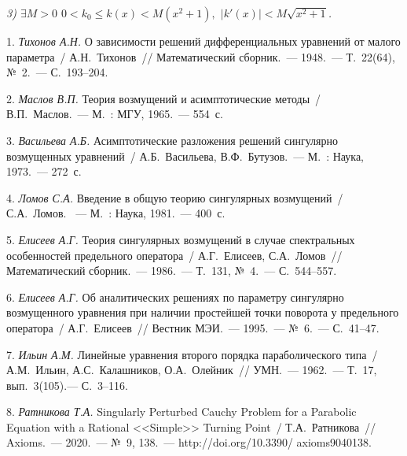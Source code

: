{\it 3) $\exists M>0$ $0<k_0\leq k(x)<M(x^2+1),$ $|k'(x)|<M \sqrt{x^2+1}$.}

\noindent {\it Тогда $\exists \mathbb{C}>0$ $\forall(x,t)\in(-\infty,+\infty)\times[0,T]$ $\forall\varepsilon\in(0,\varepsilon_0]$ $|R_n(x,t,\varepsilon)|\le \mathbb{C}.$ }

\litlist


1. {\it Тихонов А.Н.} О зависимости решений дифференциальных уравнений от малого параметра~/ А.Н.~Тихонов~// Математический сборник.~--- 1948.~--- Т.~22(64), №~2.~--- С.~193--204.

2. {\it Маслов В.П.} Теория возмущений и асимптотические методы~/ В.П.~Маслов.~--- М.~: МГУ, 1965.~--- 554~с.

3. {\it Васильева А.Б.} Асимптотические разложения решений сингулярно возмущенных уравнений~/ А.Б.~Васильева, В.Ф.~Бутузов.~--- М.~: Наука, 1973.~--- 272~с.

4. {\it Ломов С.А.} Введение в общую теорию сингулярных возмущений~/ С.А.~Ломов. ~--- М.~: Наука, 1981.~--- 400~с.

5. {\it Елисеев А.Г.} Теория сингулярных возмущений в случае спектральных особенностей предельного оператора~/ А.Г.~Елисеев, \linebreak С.А.~Ломов~// Математический сборник.~--- 1986.~--- Т.~131, №~4.~--- С.~544--557.

6. {\it Елисеев А.Г.} Об аналитических решениях по параметру сингулярно возмущенного уравнения при наличии простейшей точки поворота у предельного оператора~/ А.Г.~Елисеев~// Вестник МЭИ.~--- 1995.~--- №~6.~--- С.~41--47.

7. {\it Ильин А.М.} Линейные уравнения второго порядка параболического типа~/ А.М.~Ильин, А.С.~Калашников, О.А.~Олейник~// УМН.~--- 1962.~--- Т.~17, вып.~3(105).--- С.~3--116.

8. {\it Ратникова Т.А.} Singularly Perturbed Cauchy Problem for a Parabolic Equation with a Rational <<Simple>> Turning Point~/ Т.А.~Ратникова~// Axioms.~--- 2020.~--- №~9, 138.~--- http://doi.org/10.3390/ axioms9040138.


